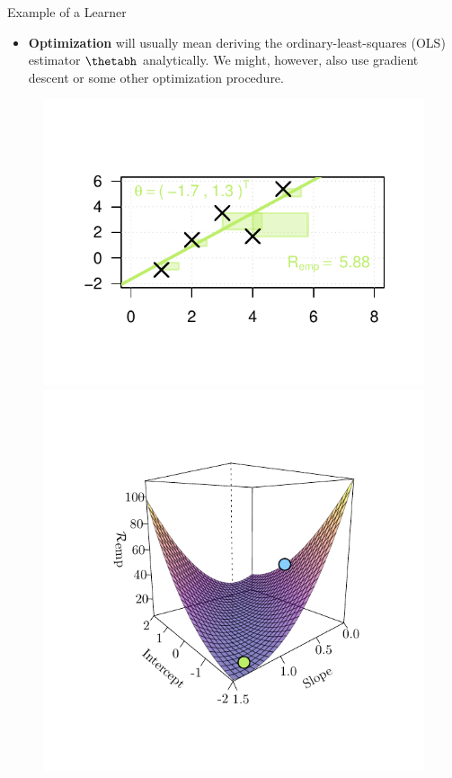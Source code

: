 \documentclass[11pt,compress,t,notes=noshow, xcolor=table]{beamer}
\begin{document}
\begin{vbframe}{Example of a Learner}
\begin{itemize}
  \framebreak
  
  \item \textbf{Optimization} will usually mean deriving the 
  ordinary-least-squares (OLS) estimator $\thetabh$ analytically. We might,
  however, also use gradient descent or some other optimization procedure.
  
    
\end{itemize}
\begin{figure}[!htb]
\includegraphics[trim=1.5cm 1.5cm 1.5cm 1.5cm, width=\linewidth]{figure/lm_reg2}  
\endminipage\hfill
{}
\includegraphics[trim=1.5cm 1.5cm 1.5cm 1.5cm, width=\linewidth]{figure/lm_reg4}
\endminipage
\end{figure}
\end{vbframe}
\end{document}

